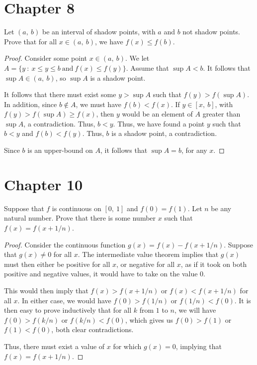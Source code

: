 \documentclass[10pt, oneside]{article}
\newenvironment{problem}[2][Problem]{\begin{trivlist}
\item[\hskip \labelsep {\bfseries #1}\hskip \labelsep {\bfseries #2.}]}{\end{trivlist}}
\begin{document}
    \section{Chapter 8}

    \begin{problem}{8.20}
      Let $(a, \ b)$ be an interval of shadow points, with $a$ and $b$ not shadow points. Prove that for all $x \in (a, \ b)$, we have
      $f(x) \leq f(b)$.
    \end{problem}

    \begin{proof}
      Consider some point $x \in (a, \ b)$. We let $A = \{y \ : \ x \leq y \leq b \ \text{and} \ f(x) \leq f(y)\}$. Assume that $\sup A < b$. It follows
      that $\sup A \in (a, \ b)$, so $\sup A$ is a shadow point.
      \newline

      It follows that there must exist some $y > \sup A$ such that $f(y) > f(\sup A)$. In addition, since $b \notin A$, we must have $f(b) < f(x)$. If $y \in [x, \ b]$, with $f(y) > f(\sup A) \geq f(x)$, then $y$ would
      be an element of $A$ greater than $\sup A$, a contradiction. Thus, $b < y$. Thus, we have found a point $y$ such that $b < y$ and $f(b) < f(y)$. Thus, $b$ is a shadow point, a contradiction.
      \newline

      Since $b$ is an upper-bound on $A$, it follows that $\sup A = b$, for any $x$. 
      \end{proof}

    \section{Chapter 10}

    \begin{problem}{10.19a}
      Suppose that $f$ is continuous on $[0, \ 1]$ and $f(0) = f(1)$. Let $n$ be any natural number. Prove that there is some number $x$
      such that $f(x) = f(x + 1/n)$.
    \end{problem}

    \begin{proof}
      Consider the continuous function $g(x) = f(x) - f(x + 1/n)$. Suppose that $g(x) \neq 0$ for all $x$. The intermediate value theorem implies that $g(x)$ must then either be
      positive for all $x$, or negative for all $x$, as if it took on both positive and negative values, it would have to take on the value $0$.
      \newline

      This would then imply that $f(x) > f(x + 1/n)$ or $f(x) < f(x + 1/n)$ for all $x$. In either case, we would have $f(0) > f(1/n)$ or $f(1/n) < f(0)$. It is then
      easy to prove inductively that for all $k$ from $1$ to $n$, we will have $f(0) > f(k/n)$ or $f(k/n) < f(0)$, which gives us $f(0) > f(1)$ or $f(1) < f(0)$, both
      clear contradictions.
      \newline

      Thus, there must exist a value of $x$ for which $g(x) = 0$, implying that $f(x) = f(x + 1/n)$.
    \end{proof}
\end{document}

